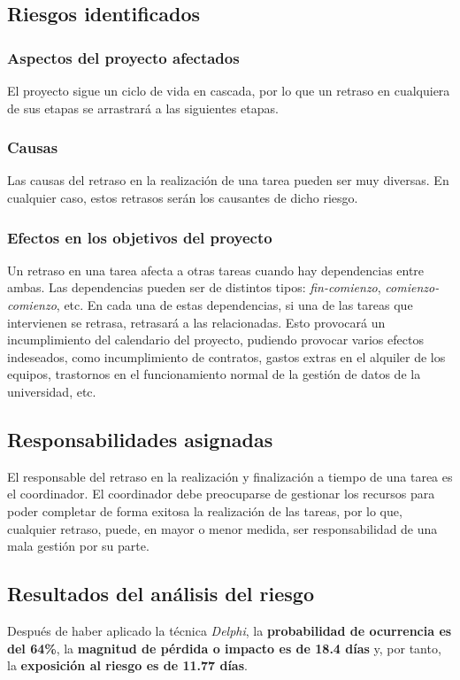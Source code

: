 \documentclass[11pt,a4paper,spanish,twoside]{book}
\begin{document}
\subsection{Riesgos identificados}
\subsubsection{Aspectos del proyecto afectados}
El proyecto sigue un ciclo de vida en cascada, por lo que un retraso en 
cualquiera de sus etapas se arrastrará a las siguientes etapas.

\subsubsection{Causas}
Las causas del retraso en la realización de una tarea pueden ser muy
diversas. En cualquier caso, estos retrasos serán los causantes de dicho
riesgo.

\subsubsection{Efectos en los objetivos del proyecto}
Un retraso en una tarea afecta a otras tareas cuando hay dependencias entre
ambas. Las dependencias pueden ser de distintos tipos: \emph{fin-comienzo}, 
\emph{comienzo-comienzo}, etc. En cada una de estas dependencias, si una de
las tareas 
que intervienen se retrasa, retrasará a las relacionadas. Esto provocará un
incumplimiento del calendario del proyecto, pudiendo provocar varios efectos
indeseados, como incumplimiento de contratos, gastos extras en el alquiler de
los equipos, trastornos en el funcionamiento normal de la gestión de datos de
la universidad, etc.

\subsection{Responsabilidades asignadas}
El responsable del retraso en la realización y finalización a tiempo de una
tarea es el coordinador. El coordinador debe preocuparse de gestionar los
recursos para poder completar de forma exitosa la realización de las
tareas, por lo que, cualquier retraso, puede, en mayor o menor medida, ser
responsabilidad de una mala gestión por su parte.

\subsection{Resultados del análisis del riesgo}
Después de haber aplicado la técnica \emph{Delphi}, la \textbf{probabilidad de
ocurrencia es del 64\%}, la \textbf{magnitud de pérdida o impacto es de 18.4
días } y, por tanto, la \textbf{exposición al riesgo es de 11.77 días}.
\end{document}
